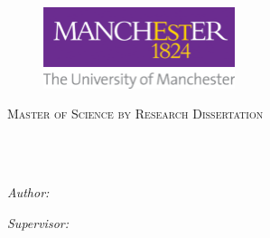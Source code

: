 \documentclass[
11pt, %
english, %
onehalfspacing, %
toctotoc, %
headsepline, %
twoside,
]{MastersDoctoralThesis} %
\author{Phoebe Ryder} %
\newcommand{\changeurlcolor}[1]{\hypersetup{urlcolor=#1}}
\begin{document}

\pagestyle{plain} %


\begin{titlepage}
\begin{center}
\changeurlcolor{frontmattercolor}

\begin{figure}
    \centering
    \includegraphics[width=0.5\textwidth]{Figures/UoM_logo}
\end{figure}

 \vspace*{.01\textheight}
\textsc{\Large Master of Science by Research Dissertation}\\[0.5cm] %

\HRule \\[0.4cm] %
{\huge \bfseries \textcolor{sectioncolor}{\ttitle}\par}\vspace{0.4cm} %
\HRule \\[1.5cm] %
 
\begin{minipage}[t]{0.4\textwidth}
\begin{flushleft} \large
\emph{Author:}\\
\href{www.VALIDLINK.com}{\authorname} %
\end{flushleft}
\end{minipage}
\begin{minipage}[t]{0.4\textwidth}
\begin{flushright} \large
\emph{Supervisor:} \\
\href{www.VALIDLINK.com}{\supname} %
\end{flushright}
\end{minipage}\\[3cm]
 

\end{center}
\end{titlepage}
\end{document}

